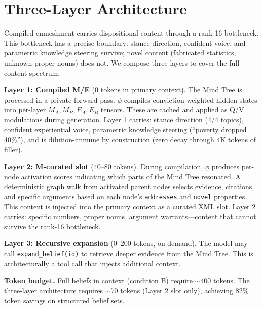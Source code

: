 \section{Three-Layer Architecture}
\label{sec:three_layer}

Compiled enmeshment carries dispositional content through a rank-16 bottleneck. This bottleneck has a precise boundary: stance direction, confident voice, and parametric knowledge steering survive; novel content (fabricated statistics, unknown proper nouns) does not. We compose three layers to cover the full content spectrum:


\textbf{Layer 1: Compiled M/E} (0 tokens in primary context). The Mind Tree is processed in a private forward pass. $\phi$ compiles conviction-weighted hidden states into per-layer $M_A, M_B, E_A, E_B$ tensors. These are cached and applied as Q/V modulations during generation. Layer 1 carries: stance direction (4/4 topics), confident experiential voice, parametric knowledge steering (``poverty dropped 40\%''), and is dilution-immune by construction (zero decay through 4K tokens of filler).

\textbf{Layer 2: M-curated slot} (40--80 tokens). During compilation, $\phi$ produces per-node activation scores indicating which parts of the Mind Tree resonated. A deterministic graph walk from activated parent nodes selects evidence, citations, and specific arguments based on each node's \texttt{addresses} and \texttt{novel} properties. This content is injected into the primary context as a curated XML slot. Layer 2 carries: specific numbers, proper nouns, argument warrants---content that cannot survive the rank-16 bottleneck.

\textbf{Layer 3: Recursive expansion} (0--200 tokens, on demand). The model may call \texttt{expand\_belief(id)} to retrieve deeper evidence from the Mind Tree. This is architecturally a tool call that injects additional context.

\textbf{Token budget.} Full beliefs in context (condition B) require $\sim$400 tokens. The three-layer architecture requires $\sim$70 tokens (Layer 2 slot only), achieving 82\% token savings on structured belief sets.

